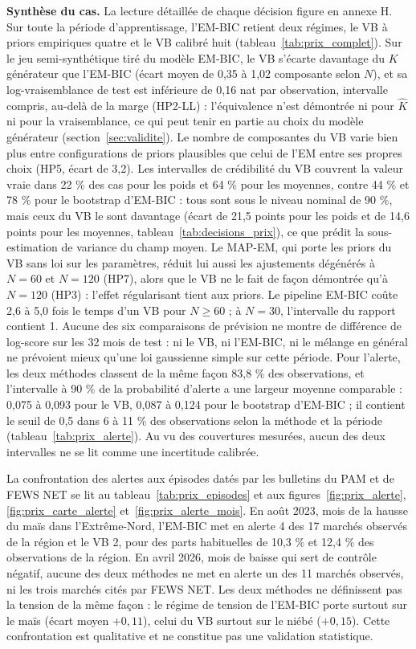\textbf{Synthèse du cas.} La lecture détaillée de chaque décision figure en annexe H. Sur toute la période d'apprentissage, l'EM-BIC retient deux régimes, le VB à priors empiriques quatre et le VB calibré huit (tableau~\ref{tab:prix_complet}). Sur le jeu semi-synthétique tiré du modèle EM-BIC, le VB s'écarte davantage du $K$ générateur que l'EM-BIC (écart moyen de 0,35 à 1,02 composante selon $N$), et sa log-vraisemblance de test est inférieure de 0,16 nat par observation, intervalle compris, au-delà de la marge (HP2-LL) : l'équivalence n'est démontrée ni pour $\hat K$ ni pour la vraisemblance, ce qui peut tenir en partie au choix du modèle générateur (section~\ref{sec:validite}). Le nombre de composantes du VB varie bien plus entre configurations de priors plausibles que celui de l'EM entre ses propres choix (HP5, écart de 3,2). Les intervalles de crédibilité du VB couvrent la valeur vraie dans 22 \% des cas pour les poids et 64 \% pour les moyennes, contre 44 \% et 78 \% pour le bootstrap d'EM-BIC : tous sont sous le niveau nominal de 90 \%, mais ceux du VB le sont davantage (écart de 21,5 points pour les poids et de 14,6 points pour les moyennes, tableau~\ref{tab:decisions_prix}), ce que prédit la sous-estimation de variance du champ moyen. Le MAP-EM, qui porte les priors du VB sans loi sur les paramètres, réduit lui aussi les ajustements dégénérés à $N = 60$ et $N = 120$ (HP7), alors que le VB ne le fait de façon démontrée qu'à $N = 120$ (HP3) : l'effet régularisant tient aux priors. Le pipeline EM-BIC coûte 2,6 à 5,0 fois le temps d'un VB pour $N \geq 60$ ; à $N = 30$, l'intervalle du rapport contient 1. Aucune des six comparaisons de prévision ne montre de différence de log-score sur les 32 mois de test : ni le VB, ni l'EM-BIC, ni le mélange en général ne prévoient mieux qu'une loi gaussienne simple sur cette période. Pour l'alerte, les deux méthodes classent de la même façon 83,8 \% des observations, et l'intervalle à 90 \% de la probabilité d'alerte a une largeur moyenne comparable : 0,075 à 0,093 pour le VB, 0,087 à 0,124 pour le bootstrap d'EM-BIC ; il contient le seuil de 0,5 dans 6 à 11 \% des observations selon la méthode et la période (tableau~\ref{tab:prix_alerte}). Au vu des couvertures mesurées, aucun des deux intervalles ne se lit comme une incertitude calibrée.

La confrontation des alertes aux épisodes datés par les bulletins du PAM et de FEWS NET se lit au tableau~\ref{tab:prix_episodes} et aux figures~\ref{fig:prix_alerte}, \ref{fig:prix_carte_alerte} et~\ref{fig:prix_alerte_mois}. En août 2023, mois de la hausse du maïs dans l'Extrême-Nord, l'EM-BIC met en alerte 4 des 17 marchés observés de la région et le VB 2, pour des parts habituelles de 10,3 \% et 12,4 \% des observations de la région. En avril 2026, mois de baisse qui sert de contrôle négatif, aucune des deux méthodes ne met en alerte un des 11 marchés observés, ni les trois marchés cités par FEWS NET. Les deux méthodes ne définissent pas la tension de la même façon : le régime de tension de l'EM-BIC porte surtout sur le maïs (écart moyen $+0{,}11$), celui du VB surtout sur le niébé ($+0{,}15$). Cette confrontation est qualitative et ne constitue pas une validation statistique.

